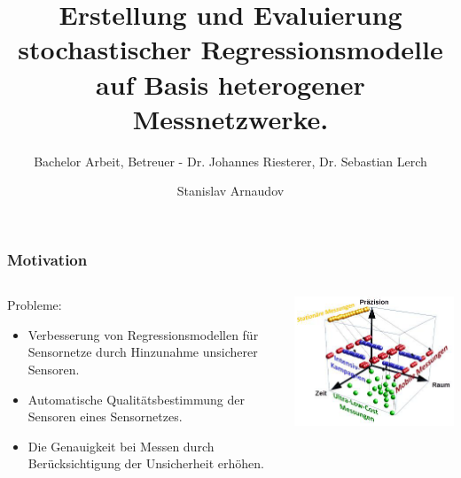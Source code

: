 \documentclass[18pt]{beamer}
\title[HITS-Vortrag]{Erstellung und Evaluierung stochastischer Regressionsmodelle auf Basis heterogener Messnetzwerke.}
\subtitle{Bachelor Arbeit, Betreuer - Dr. Johannes Riesterer, Dr. Sebastian Lerch}
\author{Stanislav Arnaudov}
\institute{TECO - Das Telecooperation Office}
\begin{document}
 



\begin{frame}
 \titlepage
\end{frame}

\begin{frame}
  \frametitle{Motivation}
  
  \begin{columns}
    \begin{column}{0.4\textwidth}
      Probleme:
      \begin{itemize}
      \item Verbesserung von Regressionsmodellen für Sensornetze  durch Hinzunahme unsicherer Sensoren.
      \item Automatische Qualitätsbestimmung der Sensoren eines Sensornetzes.
      \item Die Genauigkeit bei Messen durch Berücksichtigung der Unsicherheit erhöhen.
      \end{itemize}
    \end{column}
    \begin{column}{0.6\textwidth}
      \begin{center}
        \includegraphics[scale=0.5]{images/motivation}
      \end{center}
    \end{column}
  \end{columns}
  
\end{frame}
\end{document}
